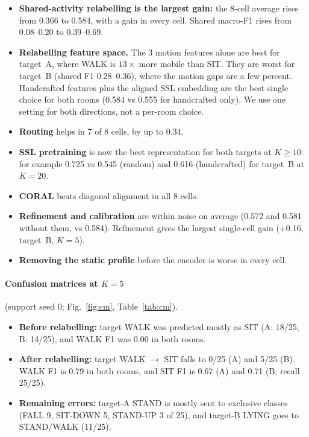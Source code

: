 \documentclass[11pt,a4paper]{article}
\begin{document}
\begin{itemize}
  \item \textbf{Shared-activity relabelling is the largest gain:} the 8-cell average rises from 0.366 to 0.584, with a gain in every cell. Shared macro-F1 rises from 0.08--0.20 to 0.39--0.69.
  \item \textbf{Relabelling feature space.} The 3 motion features alone are best for target~A, where WALK is $13\times$ more mobile than SIT. They are worst for target~B (shared F1 0.28--0.36), where the motion gaps are a few percent. Handcrafted features plus the aligned SSL embedding are the best single choice for both rooms (0.584 vs 0.555 for handcrafted only). We use one setting for both directions, not a per-room choice.
  \item \textbf{Routing} helps in 7 of 8 cells, by up to 0.34.
  \item \textbf{SSL pretraining} is now the best representation for both targets at $K\ge10$: for example 0.725 vs 0.545 (random) and 0.616 (handcrafted) for target~B at $K=20$.
  \item \textbf{CORAL} beats diagonal alignment in all 8 cells.
  \item \textbf{Refinement and calibration} are within noise on average (0.572 and 0.581 without them, vs 0.584). Refinement gives the largest single-cell gain (+0.16, target~B, $K=5$).
  \item \textbf{Removing the static profile} before the encoder is worse in every cell.
\end{itemize}

\paragraph{Confusion matrices at $K=5$} (support seed 0; Fig.~\ref{fig:cm}, Table~\ref{tab:cm}).
\begin{itemize}
  \item \textbf{Before relabelling:} target WALK was predicted mostly as SIT (A: 18/25, B: 14/25), and WALK F1 was 0.00 in both rooms.
  \item \textbf{After relabelling:} target WALK $\to$ SIT falls to 0/25 (A) and 5/25 (B). WALK F1 is 0.79 in both rooms, and SIT F1 is 0.67 (A) and 0.71 (B; recall 25/25).
  \item \textbf{Remaining errors:} target-A STAND is mostly sent to exclusive classes (FALL 9, SIT-DOWN 5, STAND-UP 3 of 25), and target-B LYING goes to STAND/WALK (11/25).
\end{itemize}
\end{document}
